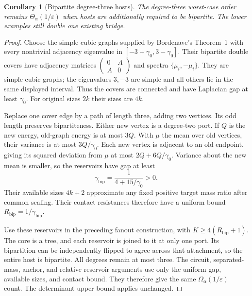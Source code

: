 \documentclass[11pt]{article}
\newtheorem{corollary}[theorem]{Corollary}
\begin{document}
\begin{corollary}[Bipartite degree-three hosts]\label{cor:bipartite}
The degree-three worst-case order remains
$\Theta_\alpha(1/\varepsilon)$ when hosts are additionally required
to be bipartite. The lower examples still double one existing bridge.
\end{corollary}
\begin{proof}
Choose the simple cubic graphs supplied by Bordenave's Theorem~1
with every nontrivial adjacency eigenvalue in
$[-3+\gamma_0,3-\gamma_0]$.
Their bipartite double covers have adjacency matrices
$\left(\begin{smallmatrix}0&A\\A&0\end{smallmatrix}\right)$ and spectra
$\{\mu_i,-\mu_i\}$.
They are simple cubic graphs; the eigenvalues $3,-3$ are simple and
all others lie in the same displayed interval. Thus the covers are
connected and have Laplacian gap at least $\gamma_0$.
For original sizes $2k$ their sizes are $4k$.

Replace one cover edge by a path of length three, adding two vertices.
Its odd length preserves bipartiteness. Either new vertex is a
degree-two port. If $Q$ is the new energy, old-graph energy is at most
$3Q$. With $\mu$ the mean over old vertices, their variance is at most
$3Q/\gamma_0$. Each new vertex is adjacent to an old endpoint, giving
its squared deviation from $\mu$ at most $2Q+6Q/\gamma_0$.
Variance about the new mean is smaller, so the reservoirs have gap
at least
\[
 \gamma_{\mathrm{bip}}=\frac1{4+15/\gamma_0}>0.
\]
Their available sizes $4k+2$ approximate any fixed positive target
mass ratio after common scaling. Their contact resistances therefore
have a uniform bound $R_{\mathrm{bip}}=1/\gamma_{\mathrm{bip}}$.

Use these reservoirs in the preceding fanout construction, with
$K\ge4(R_{\mathrm{bip}}+1)$. The core is a tree, and each reservoir
is joined to it at only one port. Its bipartition can be independently
flipped to agree across that attachment, so the entire host is
bipartite. All degrees remain at most three. The circuit, separated-mass,
anchor, and relative-reservoir arguments use only the uniform gap,
available sizes, and contact bound. They therefore give the same
$\Omega_\alpha(1/\varepsilon)$ count. The determinant upper bound
applies unchanged.
\end{proof}
\end{document}
